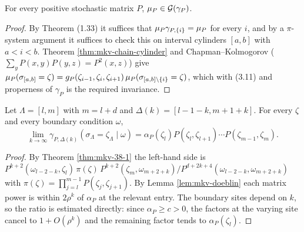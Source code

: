 \begin{theorem}
    \label{thm:mkv-step1}
    \leanok

    For every positive stochastic matrix $P$, $\mu_P \in \mathcal{G}(\gamma_P)$.
\end{theorem}
\begin{proof}
    \leanok

    By Theorem (1.33) it suffices that $\mu_P\gamma_{P,\left\{ i \right\}} = \mu_P$ for every $i$, and by a
    $\pi$-system argument it suffices to check this on interval cylinders $[a,b]$ with
    $a < i < b$. Theorem \ref{thm:mkv-chain-cylinder} and Chapman--Kolmogorov
    ($\sum_y P(x,y)P(y,z) = P^2(x,z)$) give
    $\mu_P(\sigma_{[a,b]} = \zeta) = g_P(\zeta_{i-1},\zeta_i,\zeta_{i+1})\,
    \mu_P(\sigma_{[a,b]\setminus\left\{ i \right\}} = \zeta)$, which with (3.11) and properness of
    $\gamma_P$ is the required invariance.
\end{proof}

\begin{lemma}
    \label{lem:mkv-doeblin-limit}
    \leanok

    Let $\Lambda = [l,m]$ with $m = l+d$ and $\Delta(k) = [l-1-k, m+1+k]$. For every $\zeta$ and
    every boundary condition $\omega$,
    \[
        \lim_{k \to \infty} \gamma_{P,\Delta(k)}(\sigma_\Lambda = \zeta_\Lambda \mid \omega)
          = \alpha_P(\zeta_l) P(\zeta_l,\zeta_{l+1}) \cdots P(\zeta_{m-1},\zeta_m).
    \]
\end{lemma}
\begin{proof}
    \leanok

    By Theorem \ref{thm:mkv-38-1} the left-hand side is
    $P^{k+2}(\omega_{l-2-k}, \zeta_l)\,\pi(\zeta)\,P^{k+2}(\zeta_m, \omega_{m+2+k})
    / P^{d+2k+4}(\omega_{l-2-k}, \omega_{m+2+k})$ with
    $\pi(\zeta) = \prod_{j=l}^{m-1}P(\zeta_j,\zeta_{j+1})$. By Lemma \ref{lem:mkv-doeblin} each
    matrix power is within $2\rho^k$ of $\alpha_P$ at the relevant entry. The boundary sites
    depend on $k$, so the ratio is estimated directly: since $\alpha_P \ge c > 0$, the factors
    at the varying site cancel to $1 + O(\rho^k)$ and the remaining factor tends to
    $\alpha_P(\zeta_l)$.
\end{proof}

